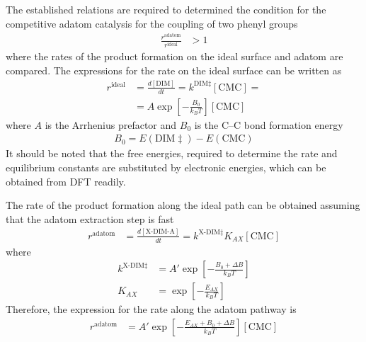 \documentclass[aps,prl,reprint,amsmath,amssymb,floatfix,notitlepage]{revtex4-1}
\begin{document}
The established relations are required to determined the condition for the competitive adatom catalysis for the coupling of two phenyl groups 
%
\begin{equation} \label{eq:compete}
\begin{split}
\frac{r^{\text{adatom}} }{ r^{\text{ideal}} } &> 1
\end{split}
\end{equation}
%
where the rates of the product formation on the ideal surface and adatom are compared. The expressions for the rate on the ideal surface can be written as
%
\begin{equation}
\begin{split}
r^{\text{ideal}} &= \frac{d[\text{DIM}]}{dt} = k^{\text{DIM}\ddagger} [\text{CMC}]  = \\
&= A \exp\left[ -\frac{B_0}{k_B T} \right] [\text{CMC}] 
\end{split}
\end{equation}
%
where $A$ is the Arrhenius prefactor and $B_0$ is the C--C bond formation energy
%
\begin{equation}
\begin{split}
B_0 = E(\text{DIM}\ddagger) - E(\text{CMC}) 
\end{split}
\end{equation}
%
It should be noted that the free energies, required to determine the rate and equilibrium constants are substituted by electronic energies, which can be obtained from DFT readily.

The rate of the product formation along the ideal path can be obtained assuming that the adatom extraction step is fast
%
\begin{equation}
\begin{split}
r^{\text{adatom}} &= \frac{d[\text{X-DIM-A}]}{dt} = k^{\text{X-DIM}\ddagger} K_{AX} [\text{CMC}] 
\end{split}
\end{equation}
%
where
%
\begin{equation}
\begin{split}
k^{\text{X-DIM}\ddagger} &= A' \exp\left[ -\frac{B_0+\Delta B}{k_B T} \right] \\
K_{AX} &= \exp\left[ -\frac{E_{AX}}{k_B T} \right] 
\end{split}
\end{equation}
%
Therefore, the expression for the rate along the adatom pathway is 
%
\begin{equation}
\begin{split}
r^{\text{adatom}} &= A' \exp\left[ -\frac{E_{AX} +B_0+\Delta B}{k_B T} \right] [\text{CMC}] 
\end{split}
\end{equation}
%
\end{document}
